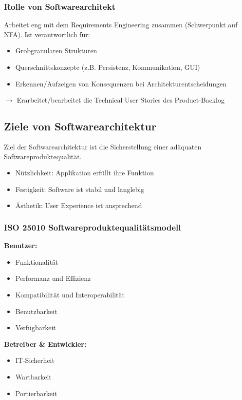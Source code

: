 \subsubsection{Rolle von Softwarearchitekt}
Arbeitet eng mit dem Requirements Engineering zusammen (Schwerpunkt auf NFA). Ist verantwortlich für:
\begin{itemize}[topsep=0pt, leftmargin=3mm]
    \setlength\itemsep{-0.3em}
    \item Grobgranularen Strukturen
    \item Querschnittskonzepte (z.B. Persistenz, Kommunikation, GUI)
    \item Erkennen/Aufzeigen von Konsequenzen bei Architekturentscheidungen
\end{itemize}
$\rightarrow$ Erarbeitet/bearbeitet die Technical User Stories des Product-Backlog

\subsection{Ziele von Softwarearchitektur}
Ziel der Softwarearchitektur ist die Sicherstellung einer adäquaten Softwareproduktequalität.
\begin{itemize}[topsep=0pt, leftmargin=3mm]
    \setlength\itemsep{-0.3em}
    \item Nützlichkeit: Applikation erfüllt ihre Funktion
    \item Festigkeit: Software ist stabil und langlebig
    \item Ästhetik: User Experience ist ansprechend
\end{itemize}

\subsubsection{ISO 25010 Softwareproduktequalitätsmodell}
\textbf{Benutzer:}
\begin{itemize}[topsep=0pt, leftmargin=3mm]
    \setlength\itemsep{-0.3em}
    \item Funktionalität
    \item Performanz und Effizienz
    \item Kompatibilität und Interoperabilität
    \item Benutzbarkeit
    \item Verfügbarkeit
\end{itemize}
\textbf{Betreiber \& Entwickler:}
\begin{itemize}[topsep=0pt, leftmargin=3mm]
    \setlength\itemsep{-0.3em}
    \item IT-Sicherheit
    \item Wartbarkeit
    \item Portierbarkeit
\end{itemize}


